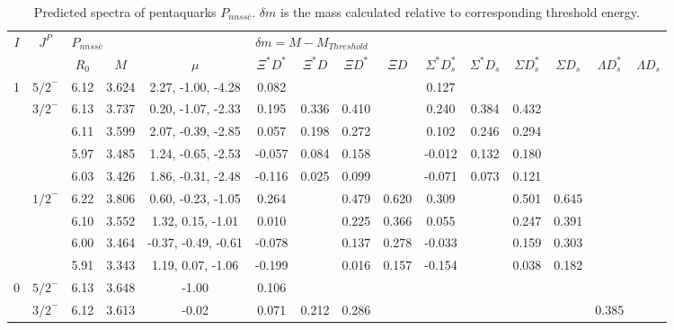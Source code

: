 \documentclass[prd,twocolumn,floatfix,nofootinbib]{revtex4}
\begin{document}
\renewcommand{\tabcolsep}{0.15cm}
\renewcommand{\arraystretch}{1.0}
\begin{table*}[!htbp]
    \caption{Predicted spectra of pentaquarks $P_{nnss\bar{c}}$.
        $\delta m$ is the mass calculated relative to corresponding threshold energy.}
    \label{tab:nnssc}
    \begin{tabular}{cc|ccc|cccccccccc}
        \bottomrule[1.5pt]\bottomrule[0.5pt]
        \multirow{2}{*}{$I$} &\multirow{2}{*}{$J^{P}$} 
        &\multicolumn{3}{l|}{$P_{nnss\bar{c}}$} 
        &\multicolumn{10}{l}{$\delta m=M-M_{Threshold}$} \\
        & &$R_{0}$ &$M$ &$\mu$
        &$\Xi^{\ast} D^{\ast}$ &$\Xi^{\ast} D$ &$\Xi D^{\ast}$ &$\Xi D$ 
        &$\Sigma^{\ast} D^{\ast}_{s}$ &$\Sigma^{\ast} D_{s}$ &$\Sigma D^{\ast}_{s}$ &$\Sigma D_{s}$ 
        &$\Lambda D^{\ast}_{s}$ &$\Lambda D_{s}$ \\ \hline
        1
            &${5/2}^{-}$    &6.12   &3.624  &2.27, -1.00, -4.28 &0.082 & & & &0.127 & & & & & \\
            &${3/2}^{-}$    &6.13   &3.737  &0.20, -1.07, -2.33 &0.195 &0.336 &0.410 & &0.240 &0.384 &0.432 & & & \\
            &               &6.11   &3.599  &2.07, -0.39, -2.85 &0.057 &0.198 &0.272 & &0.102 &0.246 &0.294 & & & \\
            &               &5.97   &3.485  &1.24, -0.65, -2.53 &-0.057 &0.084 &0.158 & &-0.012 &0.132 &0.180 & & & \\
            &               &6.03   &3.426  &1.86, -0.31, -2.48 &-0.116 &0.025 &0.099 & &-0.071 &0.073 &0.121 & & & \\
            &${1/2}^{-}$    &6.22   &3.806  &0.60, -0.23, -1.05 &0.264 & &0.479 &0.620 &0.309 & &0.501 &0.645 & & \\
            &               &6.10   &3.552  &1.32, 0.15, -1.01 &0.010 & &0.225 &0.366 &0.055 & &0.247 &0.391 & & \\
            &               &6.00   &3.464  &-0.37, -0.49, -0.61 &-0.078 & &0.137 &0.278 &-0.033 & &0.159 &0.303 & & \\
            &               &5.91   &3.343  &1.19, 0.07, -1.06 &-0.199 & &0.016 &0.157 &-0.154 & &0.038 &0.182 & & \\
        0
            &${5/2}^{-}$    &6.13   &3.648  &-1.00 &0.106 & & & & & & & & & \\
            &${3/2}^{-}$    &6.12   &3.613  &-0.02 &0.071 &0.212 &0.286 & & & & & &0.385 & \\

\end{tabular}
\end{table*}
\end{document}
